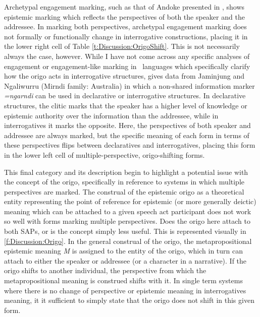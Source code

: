 Archetypal engagement marking, such as that of Andoke presented in , shows epistemic marking which reflects the perspectives of both the speaker and the addressee. In marking both perspectives, archetypal engagement marking does not formally or functionally change in interrogative constructions, placing it in the lower right cell of Table \ref{t:Discussion:OrigoShift}. This is not necessarily always the case, however. While I have not come across any specific analyses of engagement or engagement-like marking in \lfam\ languages which specifically clarify how the origo acts in interrogative structures,  gives data from Jaminjung and Ngaliwurru (Mirndi family: Australia) in which a non-shared information marker \textit{=ngarndi} can be used in declarative or interrogative structures. In declarative structures, the clitic marks that the speaker has a higher level of knowledge or epistemic authority over the information than the addressee, while in interrogatives it marks the opposite. Here, the perspectives of both speaker and addressee are always marked, but the specific meaning of each form in terms of these perspectives flips between declaratives and interrogatives, placing this form in the lower left cell of multiple-perspective, origo-shifting forms.

This final category and its description begin to highlight a potential issue with the concept of the origo, specifically in reference to systems in which multiple perspectives are marked. The construal of the epistemic origo as a theoretical entity representing the point of reference for epistemic (or more generally deictic) meaning which can be attached to a given speech act participant does not work so well with forms marking multiple perspectives. Does the origo here attach to both SAPs, or is the concept simply less useful. This is represented visually in \ref{f:Discussion:Origo}. In the general construal of the origo, the metapropositional epistemic meaning \textit{M} is assigned to the entity of the origo, which in turn can attach to either the speaker or addressee (or a character in a narrative). If the origo shifts to another individual, the perspective from which the metapropositional meaning is construed shifts with it. In single term systems where there is no change of perspective or epistemic meaning in interrogatives meaning, it it sufficient to simply state that the origo does not shift in this given form.


